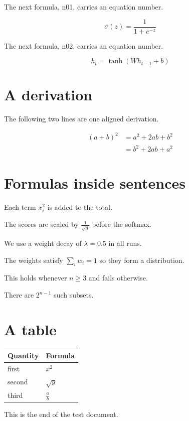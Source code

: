 \documentclass[11pt]{article}
\begin{document}
The next formula, n01, carries an equation number.

\begin{equation} \sigma ( z ) = \frac{1}{1 + e^{- z}} \end{equation}

The next formula, n02, carries an equation number.

\begin{equation} h_{t} = \tanh ( W h_{t - 1} + b ) \end{equation}

\section{A derivation}

The following two lines are one aligned derivation.

\begin{align*} ( a + b )^{2} &= a^{2} + 2 a b + b^{2} \\ &= b^{2} + 2 a b + a^{2} \end{align*}

\section{Formulas inside sentences}

Each term $x_{i}^{2}$ is added to the total.

The scores are scaled by $\frac{1}{\sqrt{d}}$ before the softmax.

We use a weight decay of $\lambda = 0.5$ in all runs.

The weights satisfy $\sum_{i} w_{i} = 1$ so they form a distribution.

This holds whenever $n \ge 3$ and fails otherwise.

There are $2^{n - 1}$ such subsets.

\section{A table}

\begin{tabular}{ll} Quantity & Formula \\ \hline first & $x^{2}$ \\ second & $\sqrt{y}$ \\ third & $\frac{a}{b}$ \end{tabular}


This is the end of the test document.
\end{document}

